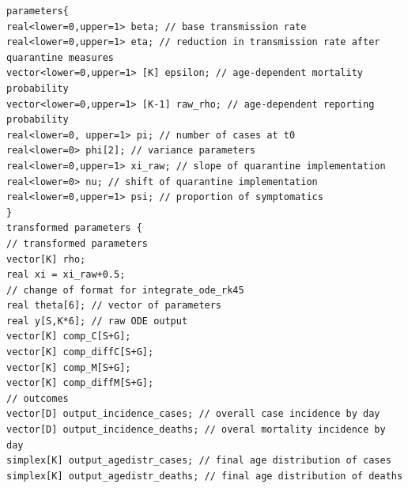 \documentclass{article}
\begin{document}
\begin{verbatim}
parameters{
real<lower=0,upper=1> beta; // base transmission rate
real<lower=0,upper=1> eta; // reduction in transmission rate after quarantine measures
vector<lower=0,upper=1> [K] epsilon; // age-dependent mortality probability
vector<lower=0,upper=1> [K-1] raw_rho; // age-dependent reporting probability
real<lower=0, upper=1> pi; // number of cases at t0
real<lower=0> phi[2]; // variance parameters
real<lower=0,upper=1> xi_raw; // slope of quarantine implementation
real<lower=0> nu; // shift of quarantine implementation
real<lower=0,upper=1> psi; // proportion of symptomatics
}
transformed parameters {
// transformed parameters
vector[K] rho;
real xi = xi_raw+0.5;
// change of format for integrate_ode_rk45
real theta[6]; // vector of parameters
real y[S,K*6]; // raw ODE output
vector[K] comp_C[S+G];
vector[K] comp_diffC[S+G];
vector[K] comp_M[S+G];
vector[K] comp_diffM[S+G];
// outcomes
vector[D] output_incidence_cases; // overall case incidence by day
vector[D] output_incidence_deaths; // overal mortality incidence by day 
simplex[K] output_agedistr_cases; // final age distribution of cases
simplex[K] output_agedistr_deaths; // final age distribution of deaths


\end{verbatim}
\end{document}
